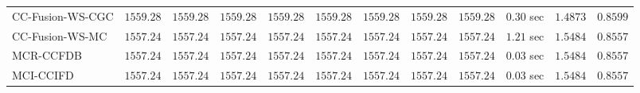 \begin{table}[H]
\begin{tabular}{lrrrrrrrrrrr}
    CC-Fusion-WS-CGC & $      1559.28$ & $      1559.28$ & $      1559.28$ & $      1559.28$ & $      1559.28$ & $      1559.28$ & $      1559.28$ & $      1559.28$ & $         0.30$ sec    & $       1.4873$  & $       0.8599$ \\ 
     CC-Fusion-WS-MC & $      1557.24$ & $      1557.24$ & $      1557.24$ & $      1557.24$ & $      1557.24$ & $      1557.24$ & $      1557.24$ & $      1557.24$ & $         1.21$ sec    & $       1.5484$  & $       0.8557$ \\ 
\cmidrule{1-1} 
           MCR-CCFDB & $      1557.24$ & $      1557.24$ & $      1557.24$ & $      1557.24$ & $      1557.24$ & $      1557.24$ & $      1557.24$ & $      1557.24$ & $         0.03$ sec    & $       1.5484$  & $       0.8557$ \\ 
\cmidrule{1-1} 
           MCI-CCIFD & $      1557.24$ & $      1557.24$ & $      1557.24$ & $      1557.24$ & $      1557.24$ & $      1557.24$ & $      1557.24$ & $      1557.24$ & $         0.03$ sec    & $       1.5484$  & $       0.8557$ \\ 
\bottomrule
\end{tabular}
\end{table}

